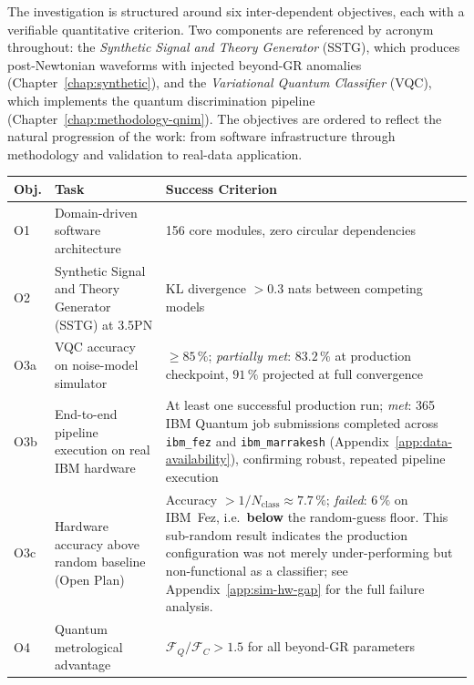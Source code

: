 \documentclass[11pt,a4paper, english]{book}
\theoremstyle{plain}
\theoremstyle{definition}
\numberwithin{equation}{chapter}
\numberwithin{figure}{chapter}
\numberwithin{table}{chapter}
\begin{document}
The investigation is structured around six inter-dependent objectives, each
with a verifiable quantitative criterion.
Two components are referenced by acronym throughout: the
\emph{Synthetic Signal and Theory Generator} (SSTG), which produces
post-Newtonian waveforms with injected beyond-GR anomalies
(Chapter~\ref{chap:synthetic}), and the \emph{Variational Quantum Classifier}
(VQC), which implements the quantum discrimination pipeline
(Chapter~\ref{chap:methodology-qnim}).
The objectives are ordered to reflect the natural progression of the work:
from software infrastructure through methodology and validation to real-data
application.

\begin{table}[ht]
\small

\centering
\begin{threeparttable}
\begin{tabular}{@{}p{1.5cm}p{4.6cm}p{4.6cm}@{}}
\toprule
\textbf{Obj.} & \textbf{Task} & \textbf{Success Criterion} \\ \midrule
O1   & Domain-driven software architecture
     & 156 core modules, zero circular dependencies \\[4pt]
O2   & Synthetic Signal and Theory Generator (SSTG) at 3.5PN
     & KL divergence $> 0.3$ nats between competing models \\[4pt]
O3a  & VQC accuracy on noise-model simulator
     & $\geq 85\,\%$; \emph{partially met}: $83.2\,\%$ at production
       checkpoint, $91\,\%$ projected at full convergence \\[4pt]
O3b  & End-to-end pipeline execution on real IBM hardware
     & At least one successful production run;
       \emph{met}: 365 IBM Quantum job submissions completed across
       \texttt{ibm\_fez} and \texttt{ibm\_marrakesh}
       (Appendix~\ref{app:data-availability}), confirming robust,
       repeated pipeline execution \\[4pt]
O3c  & Hardware accuracy above random baseline (Open Plan)
     & Accuracy $> 1/N_{\mathrm{class}} \approx 7.7\,\%$;
       \emph{failed}: $6\,\%$ on IBM~Fez, i.e.\ \textbf{below} the
       random-guess floor\tnote{a}. This sub-random result indicates
       the production configuration was not merely under-performing
       but non-functional as a classifier; see
       Appendix~\ref{app:sim-hw-gap} for the full failure analysis. \\[4pt]
O4   & Quantum metrological advantage
     & $\mathcal{F}_Q / \mathcal{F}_C > 1.5$ for all beyond-GR
       parameters \\[4pt]

\end{tabular}
\end{threeparttable}
\end{table}
\end{document}
